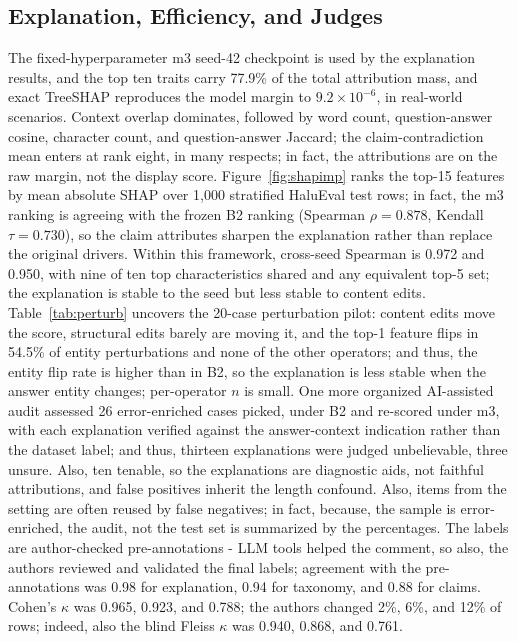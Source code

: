 \documentclass[a4paper,fleqn]{cas-sc}
\begin{document}
\subsection{Explanation, Efficiency, and Judges}

The fixed-hyperparameter m3 seed-42 checkpoint is used by the explanation results, and the top ten traits carry 77.9\% of the total attribution mass, and exact TreeSHAP reproduces the model margin to $9.2\times10^{-6}$, in real-world scenarios. Context overlap dominates, followed by word count, question-answer cosine, character count, and question-answer Jaccard; the claim-contradiction mean enters at rank eight, in many respects; in fact, the attributions are on the raw margin, not the display score. Figure~\ref{fig:shapimp} ranks the top-15 features by mean absolute SHAP over 1{,}000 stratified HaluEval test rows; in fact, the m3 ranking is agreeing with the frozen B2 ranking (Spearman $\rho=0.878$, Kendall $\tau=0.730$), so the claim attributes sharpen the explanation rather than replace the original drivers. Within this framework, cross-seed Spearman is 0.972 and 0.950, with nine of ten top characteristics shared and any equivalent top-5 set; the explanation is stable to the seed but less stable to content edits. Table~\ref{tab:perturb} uncovers the 20-case perturbation pilot: content edits move the score, structural edits barely are moving it, and the top-1 feature flips in 54.5\% of entity perturbations and none of the other operators; and thus, the entity flip rate is higher than in B2, so the explanation is less stable when the answer entity changes; per-operator $n$ is small. One more organized AI-assisted audit assessed 26 error-enriched cases picked, under B2 and re-scored under m3, with each explanation verified against the answer-context indication rather than the dataset label; and thus, thirteen explanations were judged unbelievable, three unsure. Also, ten tenable, so the explanations are diagnostic aids, not faithful attributions, and false positives inherit the length confound. Also, items from the setting are often reused by false negatives; in fact, because, the sample is error-enriched, the audit, not the test set is summarized by the percentages. The labels are author-checked pre-annotations - LLM tools helped the comment, so also, the authors reviewed and validated the final labels; agreement with the pre-annotations was 0.98 for explanation, 0.94 for taxonomy, and 0.88 for claims. Cohen's $\kappa$ was 0.965, 0.923, and 0.788; the authors changed 2\%, 6\%, and 12\% of rows; indeed, also the blind Fleiss $\kappa$ was 0.940, 0.868, and 0.761.
\end{document}
